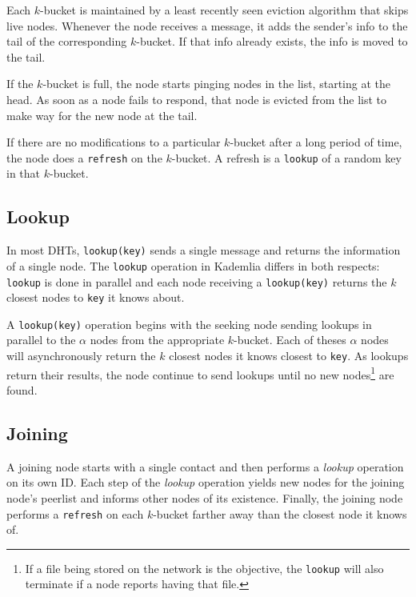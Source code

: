 Each $k$-bucket is maintained by a least recently seen eviction algorithm that skips live nodes.
Whenever the node receives a message, it adds the sender's info to the tail of the corresponding $k$-bucket.
If that info already exists, the info is moved to the tail.

If the $k$-bucket is full, the node starts pinging nodes in the list, starting at the head.
As soon as a node fails to respond, that node is evicted from the list to make way for the new node at the tail.

If there are no modifications to a particular $k$-bucket after a long period of time, the node does a \texttt{refresh} on the $k$-bucket.
A refresh is a \texttt{lookup} of a random key in that $k$-bucket.



\subsection*{Lookup}
In most DHTs, \texttt{lookup(key)} sends a single message and returns the information  of a single node.
The \texttt{lookup} operation in Kademlia differs in both respects:  \texttt{lookup} is done in parallel and each node receiving  a \texttt{lookup(key)} returns the $k$ closest nodes to \texttt{key} it knows about.


A \texttt{lookup(key)} operation begins with the seeking node sending lookups in parallel to the $\alpha$ nodes from the appropriate $k$-bucket.
Each of theses $\alpha$ nodes will asynchronously return the $k$ closest nodes it knows closest to \texttt{key}.
As lookups return their results, the node continue to send lookups until no new nodes\footnote{If a file being stored on the network is the objective, the \texttt{lookup} will also terminate if a node reports having that file.} are found.  

\subsection*{Joining}
A joining node starts with a single contact and then performs a \textit{lookup} operation on its own ID.
Each step of the \textit{lookup} operation yields new nodes for the joining node's peerlist and informs other nodes of its existence.
Finally, the joining node performs a \texttt{refresh} on each $k$-bucket farther away than the closest node it knows of.




